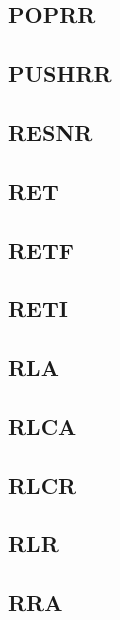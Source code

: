 \documentclass[a4paper]{article}
\begin{document}
\subsection{POPRR}
\sailfclPOPRRrrdecode
\sailfclPOPRRassembly
\sailfclPOPRRexecute
\subsection{PUSHRR}
\sailfclPUSHRRrrdecode
\sailfclPUSHRRassembly
\sailfclPUSHRRexecute
\subsection{RESNR}
\sailfclRESNRdecodeOneSix
\sailfclRESNRassembly
\sailfclRESNRexecute
\subsection{RET}
\sailfclRETdecode
\sailfclRETFcdecode
\sailfclRETIdecode
\sailfclRETassembly
\sailfclRETFassembly
\sailfclRETIassembly
\sailfclRETexecute
\sailfclRETFexecute
\sailfclRETIexecute
\subsection{RETF}
\sailfclRETFcdecode
\sailfclRETFassembly
\sailfclRETFexecute
\subsection{RETI}
\sailfclRETIdecode
\sailfclRETIassembly
\sailfclRETIexecute
\subsection{RLA}
\sailfclRLAdecode
\sailfclRLAassembly
\sailfclRLAexecute
\subsection{RLCA}
\sailfclRLCAdecode
\sailfclRLCAassembly
\sailfclRLCAexecute
\subsection{RLCR}
\sailfclRLCRrdecodeOneSix
\sailfclRLCRassembly
\sailfclRLCRexecute
\subsection{RLR}
\sailfclRLRrdecodeOneSix
\sailfclRLRassembly
\sailfclRLRexecute
\subsection{RRA}
\sailfclRRAdecode
\sailfclRRAassembly
\sailfclRRAexecute
\end{document}
